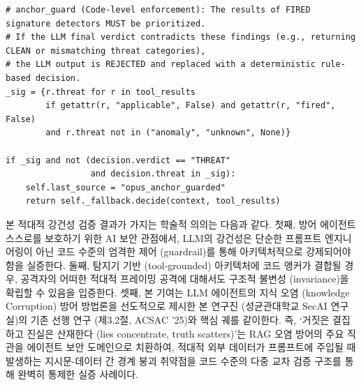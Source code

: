 \begin{lstlisting}[style=custompython, caption={\texttt{blue\_commander.LLMReasoner.decide} 내부의 \texttt{anchor\_guard} 로직. 발화된 시그니처 탐지기를 언어 모델이 반박할 경우, 해당 판정을 기각하고 결정론적 규칙으로 대체한다.}, label={lst:anchor_guard}]
# anchor_guard (Code-level enforcement): The results of FIRED signature detectors MUST be prioritized.
# If the LLM final verdict contradicts these findings (e.g., returning CLEAN or mismatching threat categories),
# the LLM output is REJECTED and replaced with a deterministic rule-based decision.
_sig = {r.threat for r in tool_results
        if getattr(r, "applicable", False) and getattr(r, "fired", False)
        and r.threat not in ("anomaly", "unknown", None)}

if _sig and not (decision.verdict == "THREAT"
                 and decision.threat in _sig):
    self.last_source = "opus_anchor_guarded"
    return self._fallback.decide(context, tool_results)
\end{lstlisting}

본 적대적 강건성 검증 결과가 가지는 학술적 의의는 다음과 같다.
첫째, 방어 에이전트 스스로를 보호하기 위한 AI 보안 관점에서, LLM의 강건성은 단순한 프롬프트 엔지니어링이 아닌 코드 수준의 엄격한 제어 (guardrail)를 통해 아키텍처적으로 강제되어야 함을 실증한다. 
둘째, 탐지기 기반 (tool-grounded) 아키텍처에 코드 앵커가 결합될 경우, 공격자의 어떠한 적대적 프레이밍 공격에 대해서도 구조적 불변성 (invariance)을 확립할 수 있음을 입증한다. 
셋째, 본 기여는 LLM 에이전트의 지식 오염 (knowledge Corruption) 방어 방법론을 선도적으로 제시한 본 연구진 (성균관대학교 SecAI 연구실)의 기존 선행 연구 (제3.2절, ACSAC '25)와 핵심 궤를 같이한다. 즉, `거짓은 결집하고 진실은 산재한다 (lies concentrate, truth scatters)'는 RAG 오염 방어의 주요 직관을 에이전트 보안 도메인으로 치환하여, 적대적 외부 데이터가 프롬프트에 주입될 때 발생하는 지시문-데이터 간 경계 붕괴 취약점을 코드 수준의 다중 교차 검증 구조를 통해 완벽히 통제한 실증 사례이다.